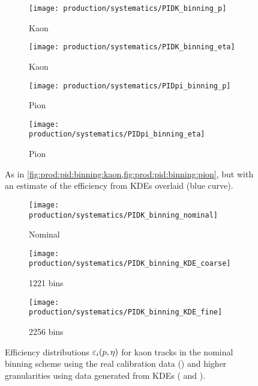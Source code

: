 \begin{figure}
  \begin{subfigure}{0.5\textwidth}
    \centering
    \texttt{[image: production/systematics/PIDK\_binning\_p]}
    \caption{Kaon \ptot}
    \label{fig:prod:syst:pid:kde_1d_binning:kaon_p}
  \end{subfigure}
  \begin{subfigure}{0.5\textwidth}
    \centering
    \texttt{[image: production/systematics/PIDK\_binning\_eta]}
    \caption{Kaon \Eta}
    \label{fig:prod:syst:pid:kde_1d_binning:kaon_eta}
  \end{subfigure}
  \begin{subfigure}{0.5\textwidth}
    \centering
    \texttt{[image: production/systematics/PIDpi\_binning\_p]}
    \caption{Pion \ptot}
    \label{fig:prod:syst:pid:kde_1d_binning:pion_p}
  \end{subfigure}
  \begin{subfigure}{0.5\textwidth}
    \centering
    \texttt{[image: production/systematics/PIDpi\_binning\_eta]}
    \caption{Pion \Eta}
    \label{fig:prod:syst:pid:kde_1d_binning:pion_eta}
  \end{subfigure}

  \caption{%
    As in \cref{fig:prod:pid:binning:kaon,fig:prod:pid:binning:pion}, but with 
    an estimate of the efficiency from \aclp{KDE} overlaid (blue curve).
  }
  \label{fig:prod:syst:pid:kde_1d_binning}
\end{figure}

\begin{figure}
  \begin{subfigure}{0.32\textwidth}
    \centering
    \texttt{[image: production/systematics/PIDK\_binning\_nominal]}
    \caption{Nominal}
    \label{fig:prod:syst:pid:kde_2d_binning:kaon:nominal}
  \end{subfigure}
  \begin{subfigure}{0.32\textwidth}
    \centering
    \texttt{[image: production/systematics/PIDK\_binning\_KDE\_coarse]}
    \caption{1221 bins}
    \label{fig:prod:syst:pid:kde_2d_binning:kaon:coarse}
  \end{subfigure}
  \begin{subfigure}{0.32\textwidth}
    \centering
    \texttt{[image: production/systematics/PIDK\_binning\_KDE\_fine]}
    \caption{2256 bins}
    \label{fig:prod:syst:pid:kde_2d_binning:kaon:fine}
  \end{subfigure}

  \caption{%
    Efficiency distributions $\varepsilon_{i}(p,\eta)$ for kaon tracks in the 
    nominal binning scheme using the real calibration data 
    () and higher 
    granularities using data generated from \aclp{KDE} 
    ( and 
    ).
  }
  \label{fig:prod:syst:pid:kde_2d_binning:kaon}
\end{figure}

